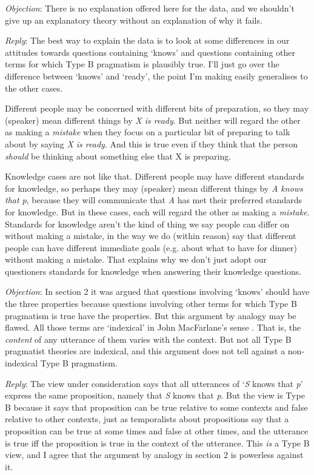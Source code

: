 \bigskip \noindent \textit{Objection}: There is no explanation offered here for the data, and we shouldn't give up an explanatory theory without an explanation of why it fails.

\medskip \noindent \textit{Reply}: The best way to explain the data is to look at some differences in our attitudes towards questions containing `knows' and questions containing other terms for which Type B pragmatism is plausibly true. I'll just go over the difference between `knows' and `ready', the point I'm making easily generalises to the other cases. 

Different people may be concerned with different bits of preparation, so they may (speaker) mean different things by \textit{X is ready}. But neither will regard the other as making a \textit{mistake} when they focus on a particular bit of preparing to talk about by saying \textit{X is ready}. And this is true even if they think that the person \textit{should} be thinking about something else that X is preparing. 

Knowledge cases are not like that. Different people may have different standards for knowledge, so perhaps they may (speaker) mean different things by \textit{A knows that p}, because they will communicate that \textit{A} has met their preferred standards for knowledge. But in these cases, each will regard the other as making a \textit{mistake}. Standards for knowledge aren't the kind of thing we say people can differ on without making a mistake, in the way we do (within reason) say that different people can have different immediate goals (e.g. about what to have for dinner) without making a mistake. That explains why we don't just adopt our questioners standards for knowledge when answering their knowledge questions.

\bigskip \noindent \textit{Objection}: In section 2 it was argued that questions involving `knows' should have the three properties because questions involving other terms for which Type B pragmatism is true have the properties. But this argument by analogy may be flawed. All those terms are `indexical' in John MacFarlane's sense \citep{MacFarlane2009-MACNC}. That is, the \textit{content} of any utterance of them varies with the context. But not all Type B pragmatist theories are indexical, and this argument does not tell against a non-indexical Type B pragmatism.

\medskip \noindent \textit{Reply}: The view under consideration says that all utterances of `\textit{S} knows that \textit{p}' express the same proposition, namely that \textit{S} knows that \textit{p}. But the view is Type B because it says that proposition can be true relative to some contexts and false relative to other contexts, just as temporalists about propositions say that a proposition can be true at some times and false at other times, and the utterance is true iff the proposition is true in the context of the utterance. This \textit{is} a Type B view, and I agree that the argument by analogy in section 2 is powerless against it.

